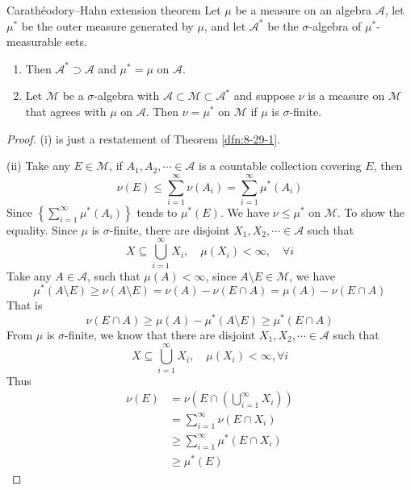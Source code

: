 \documentclass[../main.tex]{subfiles}
\begin{document}
\begin{theorem}{Carathéodory–Hahn extension theorem}{}
Let $\mu$ be a measure on an algebra $\mathcal{A}$, let $\mu^*$ be the outer measure generated by $\mu$, and let $\mathcal{A}^*$ be the $\sigma$-algebra of $\mu^*$-measurable sets.
\begin{enumerate}
\item[(i)] Then $\mathcal{A}^* \supset \mathcal{A}$ and $\mu^* = \mu$ on $\mathcal{A}$.
\item[(ii)] Let $\mathcal{M}$ be a $\sigma$-algebra with $\mathcal{A} \subset \mathcal{M} \subset \mathcal{A}^*$ and suppose $\nu$ is a measure on $\mathcal{M}$ that agrees with $\mu$ on $\mathcal{A}$. Then $\nu = \mu^*$ on $\mathcal{M}$ if $\mu$ is $\sigma$-finite.
\end{enumerate}
\end{theorem}
\begin{proof}
    (i) is just a restatement of Theorem \ref{dfn:8-29-1}.
    
    (ii) Take any \(  E\in \mathcal{M}  \), if \(  A_1,A_2,\cdots  \in \mathcal{A} \) is a countable collection  covering \(  E  \), then \[
    \nu \left( E \right)\le \sum _{i= 1}^{\infty}\nu \left( A_{i} \right)= \sum _{i= 1}^{\infty}\mu ^{*}\left( A_{i} \right)   
    \]  Since \(  \left\{ \sum _{i= 1}^{\infty}\mu ^{*}\left( A_{i} \right)  \right\}  \) tends to \(  \mu ^{*}\left( E \right)   \). We have \(  \nu \le \mu ^{*}  \) on \(  \mathcal{M}  \). To show the equality. Since \(  \mu   \) is \(   \sigma   \)-finite, there are disjoint \(  X_1,X_2,\cdots \in \mathcal{A}  \) such that \[
    X\subseteq \bigcup _{i= 1}^{\infty}X_{i},\quad \mu \left( X_{i} \right)< \infty,\quad \forall i 
    \]   Take any \(  A\in \mathcal{A}  \), such that \(  \mu \left( A \right)< \infty   \),  since \(  A\setminus E\in \mathcal{M}  \), we have \[
    \mu ^{*}\left( A\setminus E \right)\ge \nu \left( A\setminus E \right)  = \nu \left( A \right)-\nu \left( E\cap A \right)= \mu \left( A \right)-\nu \left( E\cap A \right)    
    \] That is \[
    \nu \left( E\cap A \right)\ge \mu \left( A \right)-\mu ^{*}\left( A\setminus E \right)   \ge \mu ^{*}\left( E\cap A \right) 
    \]From \(  \mu   \) is \(   \sigma   \)-finite, we know that there are disjoint \(  X_1,X_2,\cdots \in \mathcal{A}  \) such that  \[
    X\subseteq \bigcup _{i= 1}^{\infty}X_{i},\quad \mu \left( X_{i} \right)< \infty,\forall i 
    \]  Thus \[
    \begin{aligned}
    \nu \left( E \right)&= \nu \left( E\cap \left( \bigcup _{i= 1}^{\infty}X_{i} \right)  \right)   \\ 
     &=  \sum _{i= 1}^{\infty}\nu \left( E\cap X_{i} \right)\\ 
      &\ge\sum _{i= 1}^{\infty} \mu  ^{*}\left( E\cap X_{i} \right)  \\ 
       &\ge \mu ^{*}\left( E \right) 
    \end{aligned}
    \]
\end{proof}
\end{document}
